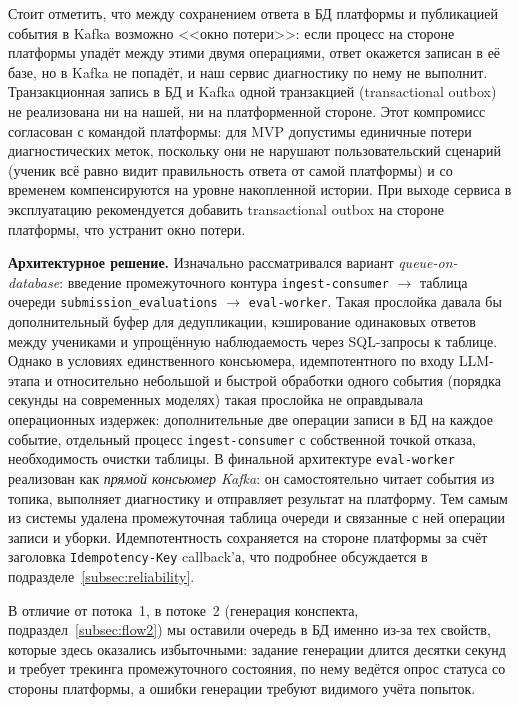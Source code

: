 \documentclass[a4paper,12pt]{extarticle}
\begin{document}
Стоит отметить, что между сохранением ответа в БД платформы и публикацией
события в Kafka возможно <<окно потери>>: если процесс на стороне платформы
упадёт между этими двумя операциями, ответ окажется записан в её базе, но в
Kafka не попадёт, и наш сервис диагностику по нему не выполнит. Транзакционная
запись в БД и Kafka одной транзакцией (transactional outbox) не реализована
ни на нашей, ни на платформенной стороне. Этот компромисс согласован с командой
платформы: для MVP допустимы единичные потери диагностических меток, поскольку
они не нарушают пользовательский сценарий (ученик всё равно видит правильность
ответа от самой платформы) и со временем компенсируются на уровне накопленной
истории. При выходе сервиса в эксплуатацию рекомендуется добавить
transactional outbox на стороне платформы, что устранит окно потери.

\textbf{Архитектурное решение.} Изначально рассматривался вариант
\textit{queue-on-database}: введение промежуточного контура
\texttt{ingest-consumer} $\rightarrow$ таблица очереди
\texttt{submission\_evaluations} $\rightarrow$ \texttt{eval-worker}. Такая
прослойка давала бы дополнительный буфер для дедупликации, кэширование
одинаковых ответов между учениками и упрощённую наблюдаемость через SQL-запросы
к таблице. Однако в условиях единственного консьюмера, идемпотентного по входу
LLM-этапа и относительно небольшой и быстрой обработки одного события (порядка
секунды на современных моделях) такая прослойка не оправдывала операционных
издержек: дополнительные две операции записи в БД на каждое событие, отдельный
процесс \texttt{ingest-consumer} с собственной точкой отказа, необходимость
очистки таблицы. В финальной архитектуре \texttt{eval-worker} реализован как
\textit{прямой консьюмер Kafka}: он самостоятельно читает события из топика,
выполняет диагностику и отправляет результат на платформу. Тем самым из системы
удалена промежуточная таблица очереди и связанные с ней операции записи и уборки.
Идемпотентность сохраняется на стороне платформы за счёт заголовка
\texttt{Idempotency-Key} callback'а, что подробнее обсуждается в
подразделе~\ref{subsec:reliability}.

В отличие от потока~1, в потоке~2 (генерация конспекта,
подраздел~\ref{subsec:flow2}) мы оставили очередь в БД именно из-за тех свойств,
которые здесь оказались избыточными: задание генерации длится десятки секунд и
требует трекинга промежуточного состояния, по нему ведётся опрос статуса со
стороны платформы, а ошибки генерации требуют видимого учёта попыток.
\end{document}
